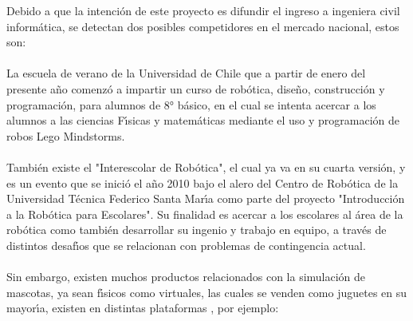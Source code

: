 \documentclass[letterpaper,12pt]{report} %
\numberwithin{equation}{section} %
\numberwithin{figure}{section} %
\numberwithin{table}{section} %
\begin{document}
Debido a que la intenci\'on de este proyecto  es difundir  el ingreso a ingeniera civil inform\'atica, se detectan dos posibles competidores en el mercado nacional, estos son:\\~\\
La escuela de verano de la Universidad de Chile que a partir de enero del presente a\~no comenz\'o a impartir  un curso de rob\'otica, dise\~no, construcci\'on y programaci\'on, para alumnos de 8° b\'asico, en el cual se intenta acercar a los alumnos a las ciencias F\'{\i}sicas y matem\'aticas mediante el uso y programaci\'on de robos Lego Mindstorms.\\~\\
Tambi\'en existe el "Interescolar de Rob\'otica", el cual ya va en su cuarta versi\'on,  y es un evento que se inici\'o el  a\~no 2010 bajo el alero del Centro de Rob\'otica de la Universidad T\'ecnica Federico Santa Mar\'{\i}a como parte del proyecto "Introducci\'on a la Rob\'otica para Escolares". Su finalidad es acercar a los escolares al \'area de la rob\'otica como tambi\'en desarrollar su ingenio y trabajo en equipo, a trav\'es de distintos desaf\'{\i}os que se relacionan con problemas de contingencia actual.\\~\\
Sin embargo, existen muchos productos relacionados con la simulaci\'on de mascotas, ya sean f\'{\i}sicos como virtuales,  las cuales se venden como juguetes  en su mayor\'{\i}a,  existen en distintas plataformas , por ejemplo:  \\
\end{document}
